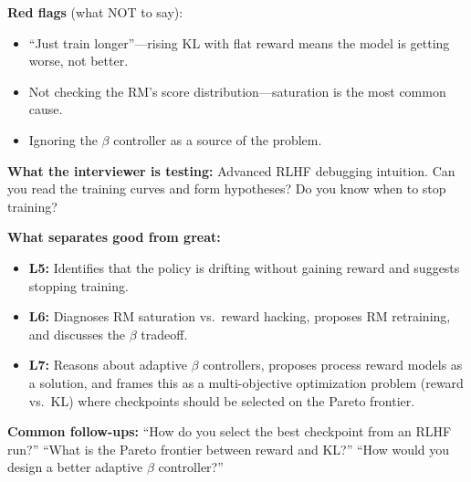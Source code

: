 \begin{interviewq}
\textbf{Red flags} (what NOT to say):
\begin{itemize}
    \item ``Just train longer''---rising KL with flat reward means the model is getting worse, not better.
    \item Not checking the RM's score distribution---saturation is the most common cause.
    \item Ignoring the $\beta$ controller as a source of the problem.
\end{itemize}

\textbf{What the interviewer is testing:} Advanced RLHF debugging intuition. Can you read the training curves and form hypotheses? Do you know when to stop training?

\textbf{What separates good from great:}
\begin{itemize}
    \item \textbf{L5:} Identifies that the policy is drifting without gaining reward and suggests stopping training.
    \item \textbf{L6:} Diagnoses RM saturation vs.\ reward hacking, proposes RM retraining, and discusses the $\beta$ tradeoff.
    \item \textbf{L7:} Reasons about adaptive $\beta$ controllers, proposes process reward models as a solution, and frames this as a multi-objective optimization problem (reward vs.\ KL) where checkpoints should be selected on the Pareto frontier.
\end{itemize}

\textbf{Common follow-ups:} ``How do you select the best checkpoint from an RLHF run?'' ``What is the Pareto frontier between reward and KL?'' ``How would you design a better adaptive $\beta$ controller?''
\end{interviewq}


